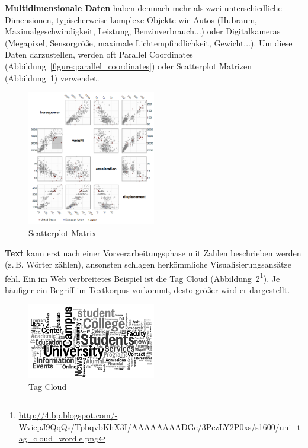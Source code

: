 \documentclass[
	headsepline,
	footsepline,
	fontsize=12pt,
	bibliography=totoc
]{scrbook}
\begin{document}
\textbf{Multidimensionale Daten} haben demnach mehr als zwei unterschiedliche Dimensionen, typischerweise komplexe Objekte wie Autos (Hubraum, Maximalgeschwindigkeit, Leistung, Benzinverbrauch...) oder Digitalkameras (Megapixel, Sensorgröße, maximale Lichtempfindlichkeit, Gewicht...). Um diese Daten darzustellen, werden oft Parallel Coordinates (Abbildung~\ref{figure:parallel_coordinates}) oder Scatterplot Matrizen (Abbildung~\ref{figure:scatterplot_matrix}) verwendet.

\begin{figure}[htbp]
   \centering
   \includegraphics[width=0.5\textwidth]{images/grundlagen-scatterplot_matrix.png}
   \caption{Scatterplot Matrix}
   \label{figure:scatterplot_matrix}
\end{figure}

\textbf{Text} kann erst nach einer Vorverarbeitungsphase mit Zahlen beschrieben werden (z.\,B. Wörter zählen), ansonsten schlagen herkömmliche Visualisierungsansätze fehl. Ein im Web verbreitetes Beispiel ist die Tag Cloud (Abbildung~\ref{figure:tag_cloud}\footnote{\url{http://4.bp.blogspot.com/-WvicpJ9QqQs/TpbqvbKhX3I/AAAAAAAADGc/3PczLY2P0xs/s1600/uni_tag_cloud_wordle.png}}). Je häufiger ein Begriff im Textkorpus vorkommt, desto größer wird er dargestellt.

\begin{figure}[htbp]
   \centering
   \includegraphics[width=0.5\textwidth]{images/grundlagen-tag_cloud.png}
   \caption{Tag Cloud}
   \label{figure:tag_cloud}
\end{figure}
\end{document}
